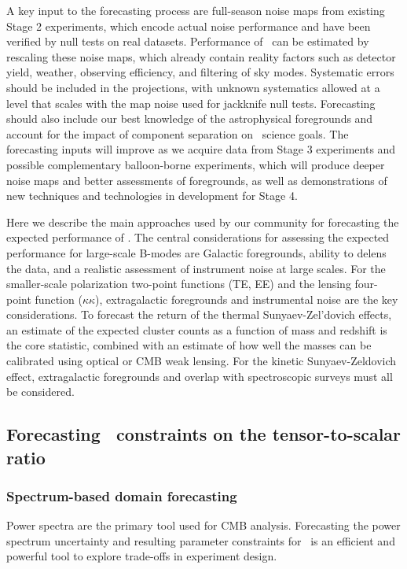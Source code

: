 A key input to the forecasting process are full-season noise maps from existing Stage 2 experiments, which encode actual noise performance and have been verified by null tests on real datasets.
Performance of \cmbexp\ can be estimated by rescaling these noise maps, which already contain reality factors such as detector yield, weather, observing efficiency, and filtering of sky modes.
Systematic errors should be included in the projections, with unknown systematics allowed at a level that scales with the map noise used for jackknife null tests.
Forecasting should also include our best knowledge of the astrophysical foregrounds and account for the impact of component separation on \cmbexp\ science goals.
The forecasting inputs will improve as we acquire data from Stage 3 experiments and possible complementary balloon-borne experiments, which will produce deeper noise maps and better assessments of foregrounds, as well as demonstrations of new techniques and technologies in development for Stage 4.

Here we describe the main approaches used by our community for forecasting the expected performance of \cmbexp. The central considerations for assessing the expected performance for large-scale B-modes are Galactic foregrounds, ability to delens the data, and a realistic assessment of instrument noise at large scales. 
For the smaller-scale polarization two-point functions (TE, EE) and the lensing four-point function ($\kappa \kappa$), extragalactic foregrounds and instrumental noise are the key considerations.
To forecast the return of the thermal Sunyaev-Zel'dovich effects, an estimate of the expected cluster counts as a function of mass and redshift is the core statistic, combined with an estimate of how well the masses can be calibrated using optical or CMB weak lensing. For the kinetic Sunyaev-Zeldovich effect, extragalactic foregrounds and overlap with spectroscopic surveys must all be considered. 

\subsection{Forecasting \cmbexp\ constraints on the tensor-to-scalar ratio}

\subsubsection{Spectrum-based domain forecasting}
\label{sec_specforecast}

Power spectra are the primary tool used for CMB analysis.
Forecasting the power spectrum uncertainty and resulting parameter constraints for \cmbexp\ is an efficient and powerful tool to explore trade-offs in experiment design.

